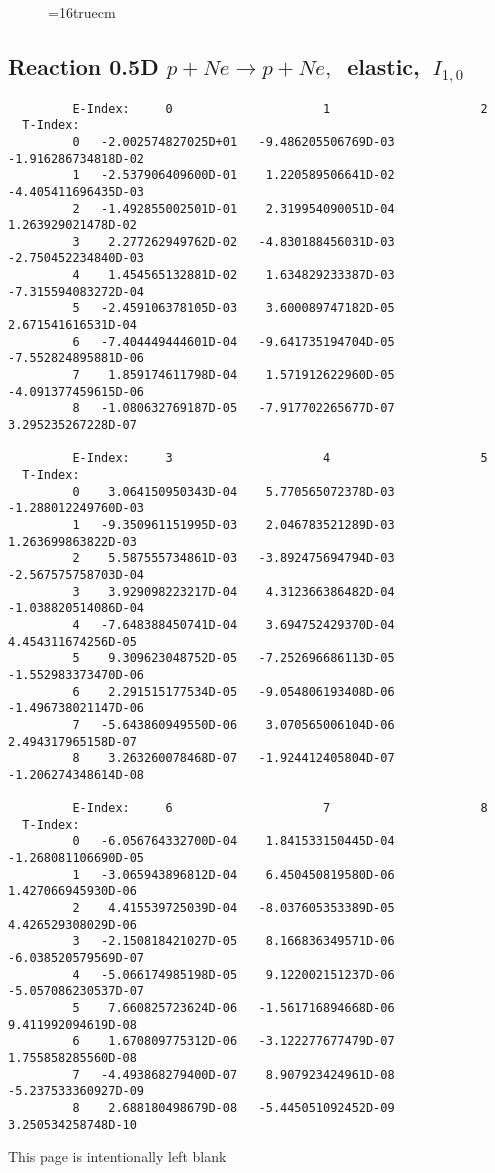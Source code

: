 \documentclass[12pt,dvipdfmx]{article}
\begin{document}
\begin{figure} \label{0.5T}
\epsfxsize=16truecm
\end{figure}
\newpage

\subsection{
Reaction 0.5D  $p + Ne \rightarrow p + Ne ,\ $
 elastic, $\  I_{1,0}$
}

\begin{small}\begin{verbatim}
         E-Index:     0                     1                     2
  T-Index:
         0   -2.002574827025D+01   -9.486205506769D-03   -1.916286734818D-02
         1   -2.537906409600D-01    1.220589506641D-02   -4.405411696435D-03
         2   -1.492855002501D-01    2.319954090051D-04    1.263929021478D-02
         3    2.277262949762D-02   -4.830188456031D-03   -2.750452234840D-03
         4    1.454565132881D-02    1.634829233387D-03   -7.315594083272D-04
         5   -2.459106378105D-03    3.600089747182D-05    2.671541616531D-04
         6   -7.404449444601D-04   -9.641735194704D-05   -7.552824895881D-06
         7    1.859174611798D-04    1.571912622960D-05   -4.091377459615D-06
         8   -1.080632769187D-05   -7.917702265677D-07    3.295235267228D-07

         E-Index:     3                     4                     5
  T-Index:
         0    3.064150950343D-04    5.770565072378D-03   -1.288012249760D-03
         1   -9.350961151995D-03    2.046783521289D-03    1.263699863822D-03
         2    5.587555734861D-03   -3.892475694794D-03   -2.567575758703D-04
         3    3.929098223217D-04    4.312366386482D-04   -1.038820514086D-04
         4   -7.648388450741D-04    3.694752429370D-04    4.454311674256D-05
         5    9.309623048752D-05   -7.252696686113D-05   -1.552983373470D-06
         6    2.291515177534D-05   -9.054806193408D-06   -1.496738021147D-06
         7   -5.643860949550D-06    3.070565006104D-06    2.494317965158D-07
         8    3.263260078468D-07   -1.924412405804D-07   -1.206274348614D-08

         E-Index:     6                     7                     8
  T-Index:
         0   -6.056764332700D-04    1.841533150445D-04   -1.268081106690D-05
         1   -3.065943896812D-04    6.450450819580D-06    1.427066945930D-06
         2    4.415539725039D-04   -8.037605353389D-05    4.426529308029D-06
         3   -2.150818421027D-05    8.166836349571D-06   -6.038520579569D-07
         4   -5.066174985198D-05    9.122002151237D-06   -5.057086230537D-07
         5    7.660825723624D-06   -1.561716894668D-06    9.411992094619D-08
         6    1.670809775312D-06   -3.122277677479D-07    1.755858285560D-08
         7   -4.493868279400D-07    8.907923424961D-08   -5.237533360927D-09
         8    2.688180498679D-08   -5.445051092452D-09    3.250534258748D-10

\end{verbatim}\end{small}
\newpage
This page is intentionally left blank
\newpage
\end{document}
